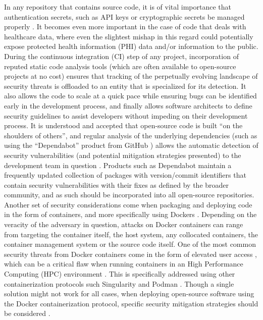 \documentclass{article}
\begin{document}
In any repository that contains source code, it is of vital importance that authentication secrets, such as API keys or cryptographic secrets be managed properly \cite{merkel_docker_nodate}. It becomes even more important in the case of code that deals with healthcare data, where even the slightest mishap in this regard could potentially expose protected health information (PHI) data and/or information to the public. During the continuous integration (CI) step of any project, incorporation of reputed static code analysis tools \cite{louridas_static_2006, ludwig_compiling_2017} (which are often available to open-source projects at no cost) ensures that tracking of the perpetually evolving landscape of security threats is offloaded to an entity that is specialized for its detection. It also allows the code to scale at a quick pace while ensuring bugs can be identified early in the development process, and finally allows software architects to define security guidelines to assist developers without impeding on their development process.
It is understood and accepted that open-source code is built “on the shoulders of others”, and regular analysis of the underlying dependencies (such as using the “Dependabot” product from GitHub \cite{noauthor_dependabot_nodate}) allows the automatic detection of security vulnerabilities (and potential mitigation strategies presented) to the development team in question \cite{alfadel_use_2021}. Products such as Dependabot maintain a frequently updated collection of packages with version/commit identifiers that contain security vulnerabilities with their fixes as defined by the broader community, and as such should be incorporated into all open-source repositories. Another set of security considerations come when packaging and deploying code in the form of containers, and more specifically using Dockers \cite{merkel_docker_nodate}. Depending on the veracity of the adversary in question, attacks on Docker containers can range from targeting the container itself, the host system, any collocated containers, the container management system or the source code itself\cite{combe_docker_2016}. One of the most common security threats from Docker containers come in the form of elevated user access \cite{combe_docker_2016, bui_analysis_2015}, which can be a critical flaw when running containers in an High Performance Computing (HPC) environment \cite{sparks_enabling_2019, bacis_dockerpolicymodules_2015}. This is specifically addressed using other containerization protocols such Singularity \cite{kurtzer_singularity_2017} and Podman \cite{gantikow_rootless_2020}. Though a single solution might not work for all cases, when deploying open-source software using the Docker containerization protocol, specific security mitigation strategies should be considered \cite{yasrab_mitigating_2021}.
\makeatother
\end{document}
